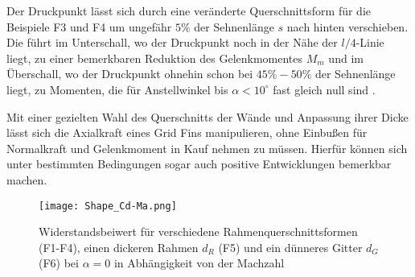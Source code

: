 Der Druckpunkt lässt sich durch eine veränderte Querschnittsform für die Beispiele F3 und F4 um ungefähr $5\%$ der Sehnenlänge $s$ nach hinten verschieben. Die führt im Unterschall, wo der Druckpunkt noch in der Nähe der $l/4$-Linie liegt, zu einer bemerkbaren Reduktion des Gelenkmomentes $M_m$ und im Überschall, wo der Druckpunkt ohnehin schon bei $45\%-50\%$ der Sehnenlänge liegt, zu Momenten, die für Anstellwinkel bis $\alpha<10^\circ$ fast gleich null sind \cite{Pattern}.

Mit einer gezielten Wahl des Querschnitts der Wände und Anpassung ihrer Dicke lässt sich die Axialkraft eines Grid Fins manipulieren, ohne Einbußen für Normalkraft und Gelenkmoment in Kauf nehmen zu müssen. Hierfür können sich unter bestimmten Bedingungen sogar auch positive Entwicklungen bemerkbar machen.
\begin{figure}[h]
	\centering
	\texttt{[image: Shape\_Cd-Ma.png]}
	\caption{Widerstandsbeiwert für verschiedene Rahmenquerschnittsformen (F1-F4), einen dickeren Rahmen $d_R$ (F5) und ein dünneres Gitter $d_G$ (F6) bei $\alpha = 0$ in Abhängigkeit von der Machzahl}
	\label{abb_Shape_Cd}
\end{figure}

